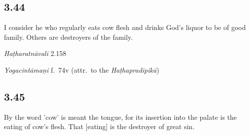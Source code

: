 \begin{ekdosis}

\subsection*{3.44}
\begin{translation}[hp03_044]
I consider he who regularly eats cow flesh and drinks God's liquor to be of good family. Others are destroyers of the family.
\end{translation}


\begin{testimonia}[hp03_044]
\emph{Haṭharatnāvalī} 2.158
\begin{versinnote}
\end{versinnote}

\emph{Yogacintāmaṇi} f.~74v (attr.~to the \emph{Haṭhapradīpikā})
\begin{versinnote}
\end{versinnote}


\end{testimonia}


\subsection*{3.45}
\begin{translation}[hp03_045]
By the word 'cow' is meant the tongue, for its insertion into the palate is the eating of cow's flesh. That [eating] is the destroyer of great sin.
\end{translation}


\end{ekdosis}
